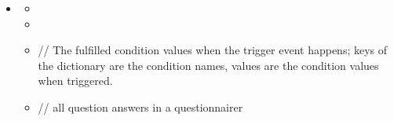 \documentclass[a4paper]{scrreprt}
\begin{document}
{\begin{itemize}
\begin{itemize}
                                \par // All the following variables use the same format.
                            \item {}
                            \item {}
                                \par // the angle between the device and the ground
                            \item {}
                            \item {}
                            \item {}
                                \par // ambient light level in SI lux units
                            \item {}
                            \item {}
                                \par // Angle between the magnetic north direction and the y-axis of the device, around the z-axis (0 to 359). 0 = North, 90 = East, 180 = South, 270 = West
                            \item {}
                            \item {}
                                \par // proximity sensor distance measured in centimeters
                        \end{itemize}

                    \item {}
                        \begin{itemize}
                            \item {}
                            \item {}
                            \item {}
                                \par // The fulfilled condition values when the trigger event happens; keys of the dictionary are the condition names, values are the condition values when triggered.
                            \item {}
                                \par // all question answers in a questionnairer
                        \end{itemize}


\end{itemize}}
\end{document}
